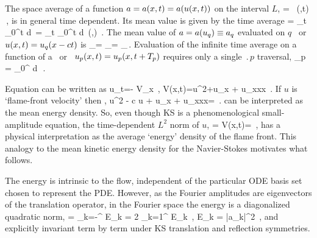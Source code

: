 The {space average} of a function $a = a(x,t) = a(u(x,t))$  on
the interval $L$,
\beq
    \expct{\obser} = \Lint{\pSpace}\, \obser(\pSpace,t)
    \,,
    \label{rpo:spac_ave}
\eeq
is in general time dependent.
Its mean value is given by the {time average}
\beq
\timeAver{\obser}
    =
\lim_{t\rightarrow \infty}  \int_0^t \! d\tau \, \expct{\obser}
    =
\lim_{t\rightarrow \infty}  \int_0^t \!
    \Lint{\tau}  d\pSpace\, \obser(\pSpace,\tau)
    \,.
\label{rpo:tim_ave}
\eeq
The mean value of $a = a(u_q) \equiv a_q$ evaluated on $q$
\eqv\ or {\reqv} $u(x,t) = u_q(x-ct)$ is
\beq
\timeAver{\obser}_\stagn = \expct{\obser}_\stagn = \obser_\stagn\,.
\label{rpo:u-eqv} \eeq Evaluation of the infinite time average
 on a function of a \po\ or \rpo\
$u_p(x,t)=u_p(x,t+{T_{p}})$ requires only a single
$\period{p}$ traversal,
\beq
  \timeAver{\obser}_p = 
    \int_0^{\period{p}} \! d\tau \, \expct{\obser}
\,.
\label{rpo:u-cyc}
\eeq

Equation  can be written as
\beq
    u_t=- V_x
        \,,\qquad
    V(x,t)={\textstyle{}}u^2+u_{x} + u_{xxx}
    \,.
If $u$ is `flame-front velocity' then \expctE,
\beq
{\textstyle{}}u^2 - c u + u_x + u_{xxx}=\expctE
\,.
\label{eq:stdks}
\eeq
can be interpreted as the mean energy
density. So, even though KS is a phenomenological
small-amplitude equation, the time-dependent {$L^2$ norm
of $u$},
\beq
    \expctE=
  \Lint{\pSpace}
  V(x,t)=
  \Lint{\pSpace} 
  \,,
  \label{ksEnergy}
\eeq
has a physical interpretation as the average `energy'
density of the flame front. This analogy to the mean kinetic energy
density for the Navier-Stokes motivates what follows.

The energy  is intrinsic to the flow,
independent of the particular ODE basis set chosen to
represent the PDE. However, as the Fourier amplitudes are
eigenvectors of the translation operator, in the Fourier
space the energy is a diagonalized quadratic norm,
\beq
\expctE
          =  \sum_{k=-\infty}^{\infty} E_k
          = 2 \sum_{k=1}^{\infty} E_k
\,,\qquad
E_k =
    {\textstyle{}}|a_k|^2
\,,
and explicitly invariant term by term
under KS translation
and reflection symmetries.

